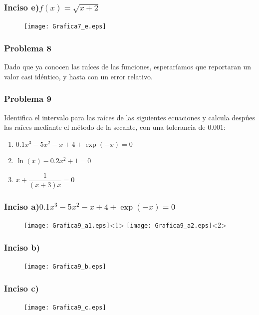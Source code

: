 \begin{frame}
\frametitle{Inciso e)$f(x) = \sqrt{x+2}$}
\begin{figure}
	\centering
	\texttt{[image: Grafica7\_e.eps]}
\end{figure}
\end{frame}
\begin{frame}
\frametitle{Problema 8}
Dado que ya conocen las raíces de las funciones, esperaríamos que reportaran un valor casi idéntico, y hasta con un error relativo.
\end{frame}
\begin{frame}
\frametitle{Problema 9}
Identifica el intervalo para las raíces de las siguientes ecuaciones y calcula despúes las raíces mediante el método de la secante, con una tolerancia de $0.001$:
	\begin{enumerate}
		\item $0.1 x^{3} - 5 x^{2} - x + 4 + \exp(-x) = 0 $
		\item $\ln(x) -0.2 x^{2} + 1 = 0$
		\item $x + \dfrac{1}{(x+3)x}= 0$
	\end{enumerate}
\end{frame}
\begin{frame}
\frametitle{Inciso a)$0.1 x^{3} - 5 x^{2} - x + 4 + \exp(-x) = 0 $}
\begin{figure}
	\centering
	\texttt{[image: Grafica9\_a1.eps]}<1> 
	\texttt{[image: Grafica9\_a2.eps]}<2>
\end{figure}
\end{frame}
\begin{frame}
\frametitle{Inciso b)}
\begin{figure}
	\centering
	\texttt{[image: Grafica9\_b.eps]} 
\end{figure}
\end{frame}
\begin{frame}
\frametitle{Inciso c)}
\begin{figure}
	\centering
	\texttt{[image: Grafica9\_c.eps]} 
\end{figure}
\end{frame}
